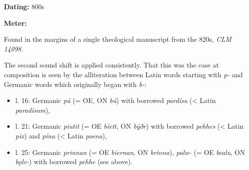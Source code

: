 
\begin{flushright}%
\textbf{Dating:} 800s

\textbf{Meter:} \Fornyrdislag%
\end{flushright}%

Found in the margins of a single theological manuscript from the 820s, \emph{CLM 14098}.

The second sound shift is applied consistently.  That this was the case at composition is seen by the alliteration between Latin words starting with \emph{p-} and Germanic words which originally began with \emph{b-}:

\begin{itemize}
  \item l. 16: Germanic \emph{pú} (= OE, ON \emph{bú}) with borrowed \emph{pardísu} (< Latin \emph{paradīsum}),
  \item l. 21: Germanic \emph{piutit} (= OE \emph{bíett}, ON \emph{býðr}) with borrowed \emph{pehhes} (< Latin \emph{pix}) and \emph{pína} (< Latin \emph{poena}),
  \item l. 25: Germanic \emph{prinnan} (= OE \emph{biernan}, ON \emph{brinna}), \emph{palw-} (= OE \emph{bealu}, ON \emph{bǫlv-}) with borrowed \emph{pehhe} (see above).
\end{itemize}

\sectionline

